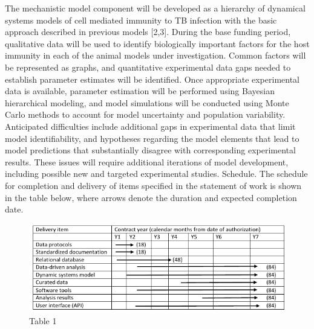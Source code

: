 \documentclass[]{book}
\begin{document}
The mechanistic model component will be developed as a hierarchy of
dynamical systems models of cell mediated immunity to TB infection with
the basic approach described in previous models {[}2,3{]}. During the
base funding period, qualitative data will be used to identify
biologically important factors for the host immunity in each of the
animal models under investigation. Common factors will be represented as
graphs, and quantitative experimental data gaps needed to establish
parameter estimates will be identified. Once appropriate experimental
data is available, parameter estimation will be performed using Bayesian
hierarchical modeling, and model simulations will be conducted using
Monte Carlo methods to account for model uncertainty and population
variability. Anticipated difficulties include additional gaps in
experimental data that limit model identifiability, and hypotheses
regarding the model elements that lead to model predictions that
substantially disagree with corresponding experimental results. These
issues will require additional iterations of model development,
including possible new and targeted experimental studies. Schedule. The
schedule for completion and delivery of items specified in the statement
of work is shown in the table below, where arrows denote the duration
and expected completion date.

\begin{figure}

{\centering \includegraphics[width=0.7\linewidth]{figures/Fig3_Schedule} 

}

\caption{Table 1}\label{fig:schedule}
\end{figure}
\end{document}
